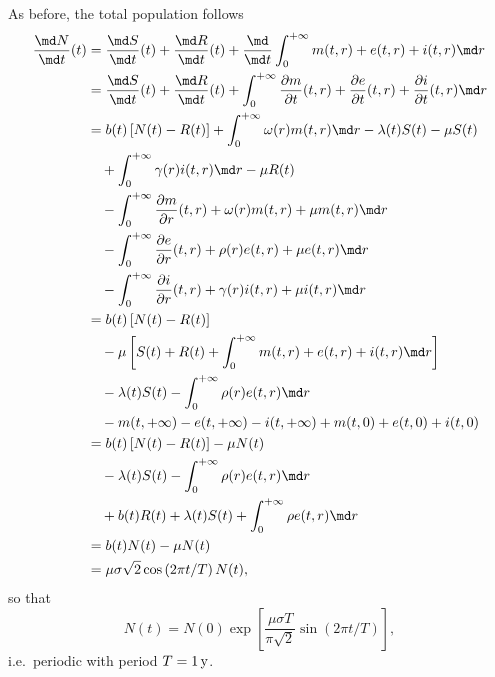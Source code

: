 \documentclass{jpmarticle}
\begin{document}
As before, the total population follows
\begin{equation}
  \begin{split}
    \frac{\md N}{\md t}(t)
    &= \frac{\md S}{\md t}(t)
    + \frac{\md R}{\md t}(t)
    + \frac{\md}{\md t} \int_0^{+\infty} m(t, r) + e(t, r) + i(t, r) \md r
    \\
    &= \frac{\md S}{\md t}(t)
    + \frac{\md R}{\md t}(t)
    + \int_0^{+\infty} \frac{\partial m}{\partial t}(t, r)
    + \frac{\partial e}{\partial t}(t, r)
    + \frac{\partial i}{\partial t}(t, r) \md r
    \\
    &=
    b(t) \left[N(t) - R(t)\right]
    + \int_0^{+\infty} \omega(r) m(t, r) \md r
    - \lambda(t) S(t) - \mu S(t)
    \\ & \quad {}
    + \int_0^{+\infty} \gamma(r) i(t, r) \md r
    - \mu R(t)
    \\ & \quad {}
    - \int_0^{+\infty}
    \frac{\partial m}{\partial r}(t, r)
    + \omega(r) m(t, r)
    + \mu m(t, r)
    \md r
    \\ & \quad {}
    - \int_0^{+\infty}
    \frac{\partial e}{\partial r}(t, r)
    + \rho(r) e(t, r)
    + \mu e(t, r)
    \md r
    \\ & \quad {}
    - \int_0^{+\infty}
    \frac{\partial i}{\partial r}(t, r)
    + \gamma(r) i(t, r)
    + \mu i(t, r)
    \md r
    \\
    &=
    b(t) \left[N(t) - R(t)\right]
    \\ & \quad {}
    - \mu \left[
      S(t) + R(t)
      + \int_0^{+\infty}
      m(t, r) + e(t, r) + i(t, r)
      \md r
    \right]
    \\ & \quad {}
    - \lambda(t) S(t)
    - \int_0^{+\infty}
    \rho(r) e(t, r)
    \md r
    \\ & \quad {}
    - m(t, +\infty) - e(t, +\infty) - i(t, +\infty)
    + m(t, 0) + e(t, 0) + i(t, 0)
    \\
    &=
    b(t) \left[N(t) - R(t)\right]
    - \mu N(t)
    \\ & \quad {}
    - \lambda(t) S(t)
    - \int_0^{+\infty}
    \rho(r) e(t, r)
    \md r
    \\ & \quad {}
    + b(t) R(t)
    + \lambda(t) S(t)
    + \int_0^{+\infty} \rho e(t, r) \md r
    \\
    &= b(t) N(t) - \mu N(t)
    \\
    &= \mu \sigma \sqrt{2} \cos\left(2 \pi t / T\right) N(t),
  \end{split}
\end{equation}
so that
\begin{equation}
  N(t) = N(0) \exp\left[
    \frac{\mu \sigma T}{\pi \sqrt{2}}
    \sin\left(2 \pi t / T\right)
  \right],
\end{equation}
i.e.~periodic with period $T = \unit[1]{y}$.


\printbibliography
\end{document}
